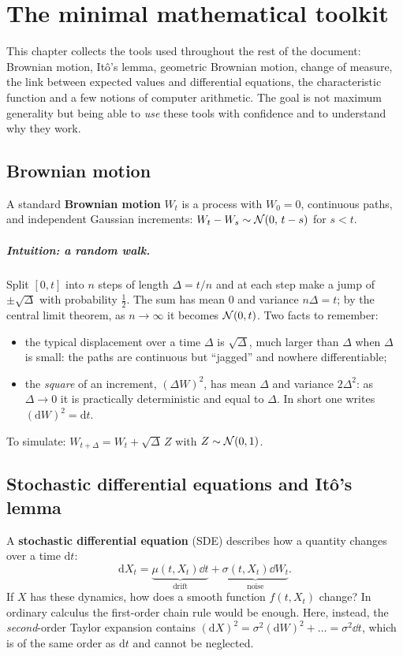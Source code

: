 \chapter{The minimal mathematical toolkit}
\label{cap:strumenti}

This chapter collects the tools used throughout the rest of the document: Brownian motion, Itô's lemma, geometric
Brownian motion, change of measure, the link between expected values and differential equations, the
characteristic function and a few notions of computer arithmetic. The goal is not maximum generality but being able
to \emph{use} these tools with confidence and to understand why they work.

\section{Brownian motion}

\begin{definizione}
A standard \textbf{Brownian motion} $W_t$ is a process with $W_0=0$, continuous paths, and independent Gaussian
increments: $W_t-W_s\sim\mathcal{N}(0,\,t-s)$ for $s<t$.
\end{definizione}

\paragraph{Intuition: a random walk.} Split $[0,t]$ into $n$ steps of length $\Delta=t/n$ and at each step make a
jump of $\pm\sqrt\Delta$ with probability $\tfrac12$. The sum has mean $0$ and variance $n\Delta=t$; by the central
limit theorem, as $n\to\infty$ it becomes $\mathcal{N}(0,t)$. Two facts to remember:
\begin{itemize}
\item the typical displacement over a time $\Delta$ is $\sqrt\Delta$, much larger than $\Delta$ when $\Delta$ is
small: the paths are continuous but ``jagged'' and nowhere differentiable;
\item the \emph{square} of an increment, $(\Delta W)^2$, has mean $\Delta$ and variance $2\Delta^2$: as
$\Delta\to0$ it is practically deterministic and equal to $\Delta$. In short one writes
$(\mathrm{d}W)^2=\mathrm{d}t$.
\end{itemize}
To simulate: $W_{t+\Delta}=W_t+\sqrt\Delta\,Z$ with $Z\sim\mathcal{N}(0,1)$.

\section{Stochastic differential equations and Itô's lemma}
A \textbf{stochastic differential equation} (SDE) describes how a quantity changes over a time $\mathrm{d}t$:
\[
\mathrm{d}X_t=\underbrace{\mu(t,X_t)\dd t}_{\text{drift}}+\underbrace{\sigma(t,X_t)\dd W_t}_{\text{noise}} .
\]
If $X$ has these dynamics, how does a smooth function $f(t,X_t)$ change? In ordinary calculus the first-order chain
rule would be enough. Here, instead, the \emph{second}-order Taylor expansion contains
$(\mathrm{d}X)^2=\sigma^2(\mathrm{d}W)^2+\dots=\sigma^2\dd t$, which is of the same order as $\mathrm{d}t$ and cannot
be neglected.

